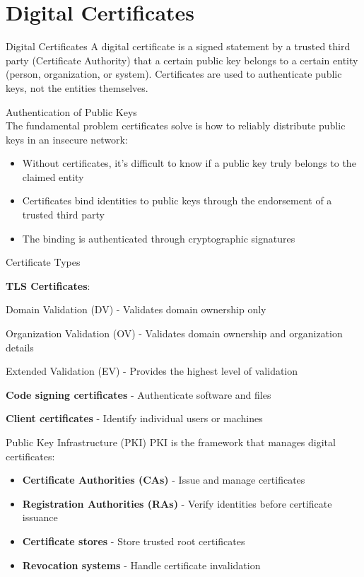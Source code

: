 \section{Digital Certificates}

\small



\begin{definition}{Digital Certificates}
A digital certificate is a signed statement by a trusted third party (Certificate Authority) that a certain public key belongs to a certain entity (person, organization, or system). Certificates are used to authenticate public keys, not the entities themselves.
\end{definition}


\begin{concept}{Authentication of Public Keys}\\
The fundamental problem certificates solve is how to reliably distribute public keys in an insecure network:
\begin{itemize}
    \item Without certificates, it's difficult to know if a public key truly belongs to the claimed entity
    \item Certificates bind identities to public keys through the endorsement of a trusted third party
    \item The binding is authenticated through cryptographic signatures
\end{itemize}
\end{concept}



\begin{definition}{Certificate Types}

    \textbf{TLS Certificates}:

     Domain Validation (DV) - Validates domain ownership only

        Organization Validation (OV) - Validates domain ownership and organization details

        Extended Validation (EV) - Provides the highest level of validation

\textbf{Code signing certificates} - Authenticate software and files

\textbf{Client certificates} - Identify individual users or machines
\end{definition}

\begin{concept}{Public Key Infrastructure (PKI)}
PKI is the framework that manages digital certificates:
\begin{itemize}
    \item \textbf{Certificate Authorities (CAs)} - Issue and manage certificates
    \item \textbf{Registration Authorities (RAs)} - Verify identities before certificate issuance
    \item \textbf{Certificate stores} - Store trusted root certificates
    \item \textbf{Revocation systems} - Handle certificate invalidation
\end{itemize}
\end{concept}

